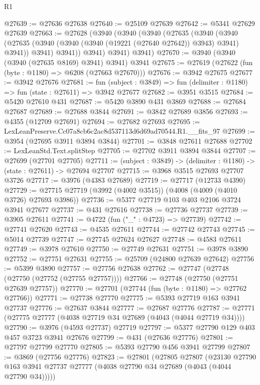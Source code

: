 \begin{lexlean}{R1}
\begin{coremodule}
@27639 := @27636 @27638
@27640 := @25109 @27639
@27642 := @5341 @27629 @27639
@27663 := @27628
    (@3940
      (@3940
        (@3940
          (@27635
            (@3940
              (@3940
                (@27635 (@3940 (@3940 (@3940 (@19221 (@27640 @27642)) @3943) @3941) @3941))
                @3941)
              @3941))
          @3941)
        @3941)
      @3941)
@27670 := @3940 (@3940 (@3940 (@27635 @8169) @3941) @3941) @3941
@27675 := @27619 (@27622 (fun (byte : @1180) => @6208 (@27663 @27670)))
@27676 := @3942 @27675
@27677 := @3942 @27676
@27681 := fun (subject : @3849) => fun (delimiter : @1180) => fun (state : @27611) => @3942 @27677
@27682 := @3951 @3515
@27684 := @5420 @27610 @431
@27687 := @5420 @3890 @431 @3869
@27688 := @27684 @27687
@27689 := @27688 @3844
@27691 := @3842 @27689 @3856
@27693 := @4355 (@12709 @27691)
@27694 := @27682 @27693
@27695 := LexLeanPreserve.Cc07a8cb6c2ac8d537113d6d69ad70544.R1.__fits_97
@27699 := @3954 (@27695 @3911 @3894 @3844)
@27701 := @3848 @27611 @27688
@27702 := LexLeanStd.Text.splitStep
@27705 := @27702 @3911 @3894 @3844
@27707 := @27699 (@27701 @27705)
@27711 := (subject : @3849) -> (delimiter : @1180) -> (state : @27611) -> @27694 @27707
@27715 := @3968 @3515 @27693 @27707 @3726
@27717 := @3976 (@4383 @27689)
@27719 := @27717 (@12733 @4390)
@27729 := @27715 @27719 (@3992 (@4002 @3515)) (@4008 (@4009 (@4010 @3726) @27693 @3986))
@27736 := @5377 @27719 @103 @403 @2106 @3724 @3941 @27677
@27737 := @431 @27616
@27738 := @27736 @27737
@27739 := @3905 @27611
@27741 := @4722 (fun ("_" : @4723) => @27739)
@27742 := @27741 @27620
@27743 := @4535 @27611
@27744 := @27742 @27743
@27745 := @5014 @27739
@27747 := @27745 @27624 @27627
@27748 := @4583 @27611
@27749 := @3978 @27610
@27750 := @27749 @27631
@27751 := @3978 @3890
@27752 := @27751 @27631
@27755 := @25709 (@24800 @27639 @27642)
@27756 := @5399 @3890
@27757 := @27756 @27638
@27762 := @27747 (@27748 (@27750 (@27752 (@27755 @27757))))
@27766 := @27748 (@27750 (@27751 @27639 @27757))
@27770 := @27701 (@27744 (fun (byte : @1180) => @27762 @27766))
@27771 := @27738 @27770
@27775 := @5393 @27719 @163 @3941 @27737
@27776 := @27637 @3844
@27777 := @27687 @27776
@27787 := @27771 (@27775 @27777 (@4038 @27719 @34 @27689 (@4043 (@4044 @27719 @34))))
@27790 := @3976 (@4593 @27737) @27719
@27797 := @5377 @27790 @129 @403 @457 @3723 @3941 @27676
@27799 := @431 (@27636 @27776)
@27801 := @27797 @27799 @27770
@27805 := @5393 @27790 @456 @3941 @27799
@27807 := @3869 (@27756 @27776)
@27823 := @27801
    (@27805
      @27807
      (@23130 @27790 @163 @3941 @27737 @27777 (@4038 @27790 @34 @27689 (@4043 (@4044 @27790 @34)))))

\end{coremodule}
\end{lexlean}
